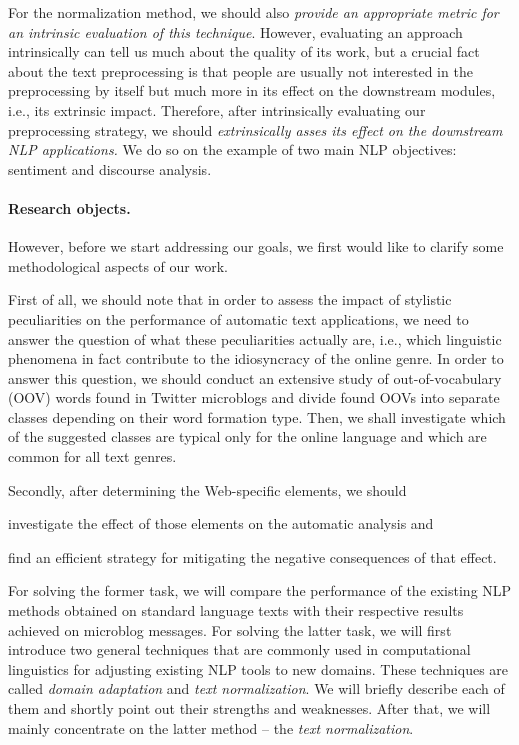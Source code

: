 For the normalization method, we should also \emph{provide an
  appropriate metric for an intrinsic evaluation of this technique}.
However, evaluating an approach intrinsically can tell us much about
the quality of its work, but a crucial fact about the text
preprocessing is that people are usually not interested in the
preprocessing by itself but much more in its effect on the downstream
modules, i.e., its extrinsic impact.  Therefore, after intrinsically
evaluating our preprocessing strategy, we should \emph{extrinsically
  asses its effect on the downstream NLP applications.}  We do so on
the example of two main NLP objectives: sentiment and discourse
analysis.

\paragraph{Research objects.}

However, before we start addressing our goals, we first would like to
clarify some methodological aspects of our work.

First of all, we should note that in order to assess the impact of
stylistic peculiarities on the performance of automatic text
applications, we need to answer the question of what these
peculiarities actually are, i.e., which linguistic phenomena in fact
contribute to the idiosyncracy of the online genre.  In order to
answer this question, we should conduct an extensive study of
out-of-vocabulary (OOV) words found in Twitter microblogs and divide
found OOVs into separate classes depending on their word formation
type.  Then, we shall investigate which of the suggested classes are
typical only for the online language and which are common for all text
genres.

Secondly, after determining the Web-specific elements, we should
\begin{inparaenum}
\item investigate the effect of those elements on the automatic analysis and
\item find an efficient strategy for mitigating the negative consequences of
  that effect.
\end{inparaenum}
For solving the former task, we will compare the performance of the existing
NLP methods obtained on standard language texts with their respective results
achieved on microblog messages.  For solving the latter task, we will first
introduce two general techniques that are commonly used in computational
linguistics for adjusting existing NLP tools to new domains.  These techniques
are called \emph{domain adaptation} and \emph{text normalization}.  We will
briefly describe each of them and shortly point out their strengths and
weaknesses.  After that, we will mainly concentrate on the latter method --
the \emph{text normalization}.

